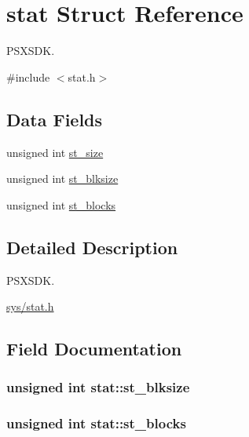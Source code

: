 \hypertarget{structstat}{}\section{stat Struct Reference}
\label{structstat}


P\+S\+X\+S\+D\+K.  




{\ttfamily \#include $<$stat.\+h$>$}

\subsection*{Data Fields}
\begin{DoxyCompactItemize}
\item 
unsigned int \hyperlink{structstat_af4a3c7f1e38a875f5e01700937482132}{st\+\_\+size}
\item 
unsigned int \hyperlink{structstat_ad67a66fb3cc1650b60499ce5a079b494}{st\+\_\+blksize}
\item 
unsigned int \hyperlink{structstat_a602c92ca5c5fff2d3aae7d0ba60e05c7}{st\+\_\+blocks}
\end{DoxyCompactItemize}


\subsection{Detailed Description}
P\+S\+X\+S\+D\+K. 

\hyperlink{stat_8h}{sys/stat.\+h} 

\subsection{Field Documentation}
\hypertarget{structstat_ad67a66fb3cc1650b60499ce5a079b494}{}
\subsubsection[{st\+\_\+blksize}]{\setlength{\rightskip}{0pt plus 5cm}unsigned int stat\+::st\+\_\+blksize}\label{structstat_ad67a66fb3cc1650b60499ce5a079b494}
\hypertarget{structstat_a602c92ca5c5fff2d3aae7d0ba60e05c7}{}
\subsubsection[{st\+\_\+blocks}]{\setlength{\rightskip}{0pt plus 5cm}unsigned int stat\+::st\+\_\+blocks}\label{structstat_a602c92ca5c5fff2d3aae7d0ba60e05c7}
\hypertarget{structstat_af4a3c7f1e38a875f5e01700937482132}{}
